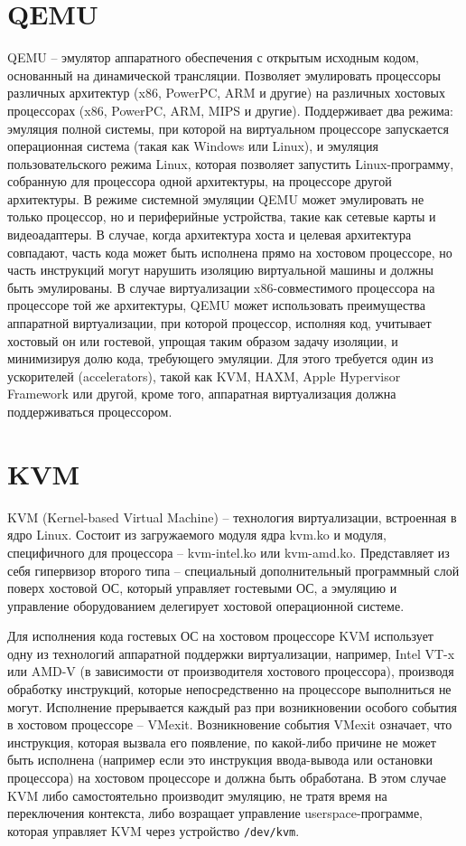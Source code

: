 \documentclass{mipt-thesis-bs}
\begin{document}
\section*{QEMU}

QEMU -- эмулятор аппаратного обеспечения с открытым исходным кодом, основанный на динамической трансляции. Позволяет эмулировать процессоры различных архитектур (x86, PowerPC, ARM и другие) на различных хостовых процессорах (x86, PowerPC, ARM, MIPS и другие). Поддерживает два режима: эмуляция полной системы, при которой на виртуальном процессоре запускается операционная система (такая как Windows или Linux), и эмуляция пользовательского режима Linux, которая позволяет запустить Linux-программу, собранную для процессора одной архитектуры, на процессоре другой архитектуры\cite{qemu-bellard}. В режиме системной эмуляции QEMU может эмулировать не только процессор, но и периферийные устройства, такие как сетевые карты и видеоадаптеры. В случае, когда архитектура хоста и целевая архитектура совпадают, часть кода может быть исполнена прямо на хостовом процессоре, но часть инструкций могут нарушить изоляцию виртуальной машины и должны быть эмулированы. В случае виртуализации x86-совместимого процессора на процессоре той же архитектуры, QEMU может использовать преимущества аппаратной виртуализации, при которой процессор, исполняя код, учитывает хостовый он или гостевой, упрощая таким образом задачу изоляции, и минимизируя долю кода, требующего эмуляции. Для этого требуется один из ускорителей (accelerators), такой как KVM, HAXM, Apple Hypervisor Framework или другой, кроме того, аппаратная виртуализация должна поддерживаться процессором\cite{qemu-ibm}.

\section*{KVM}

KVM (Kernel-based Virtual Machine) -- технология виртуализации, встроенная в ядро Linux\cite{kvm}. Состоит из загружаемого модуля ядра kvm.ko и модуля, специфичного для процессора -- kvm-intel.ko или kvm-amd.ko. Представляет из себя гипервизор второго типа -- специальный дополнительный программный слой поверх хостовой ОС, который управляет гостевыми ОС, а эмуляцию и управление оборудованием делегирует хостовой операционной системе\cite{t2}\cite{kvm1}.

Для исполнения кода гостевых ОС на хостовом процессоре KVM использует одну из технологий аппаратной поддержки виртуализации, например, Intel VT-x или AMD-V (в зависимости от производителя хостового процессора), производя обработку инструкций, которые непосредственно на процессоре выполниться не могут. Исполнение прерывается каждый раз при возникновении особого события в хостовом процессоре -- VMexit. Возникновение события VMexit означает, что инструкция, которая вызвала его появление, по какой-либо причине не может быть исполнена (например если это инструкция ввода-вывода или остановки процессора) на хостовом процессоре и должна быть обработана\cite{im}. В этом случае KVM либо самостоятельно производит эмуляцию, не тратя время на переключения контекста, либо возращает управление userspace-программе, которая управляет KVM через устройство \texttt{/dev/kvm}.
\end{document}
